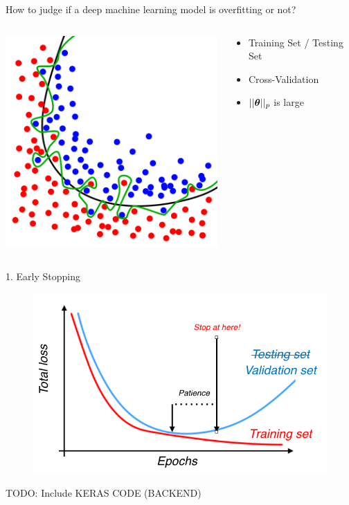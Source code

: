 \documentclass[xcolor=pdftex,dvipsnames,table,mathserif]{beamer}
\begin{document}
\begin{frame}{How to judge if a deep machine learning model is overfitting or not?}
\begin{columns}
\begin{column}{.5\textwidth}
\includegraphics[width=.95 \columnwidth]{../graphics/overfitting}
\end{column}
\begin{column}{.5\textwidth}
\begin{itemize}
\item Training Set / Testing Set
\item Cross-Validation
\item $||\boldsymbol{\theta}||_p$ is large
\end{itemize}
\end{column}
\end{columns}
\end{frame}

\begin{frame}{1. Early Stopping}
\begin{figure}
\includegraphics[width=.75 \columnwidth]{../graphics/EarlyStopping}
\end{figure}
TODO: Include KERAS CODE (BACKEND)
\end{frame}
\end{document}
